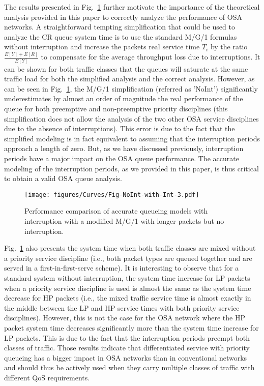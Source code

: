 \documentclass[11pt,journal,oneside,onecolumn,draftclsnofoot]{IEEEtran}
\begin{document}
The results presented in Fig.~\ref{Fig-NoInt-with-Int-3} further motivate the importance of the theoretical analysis provided in this paper to correctly analyze the performance of OSA networks. A straightforward tempting simplification that could be used to analyze the CR queue system time is to use the standard M/G/1 formulas without interruption and increase the packets real service time  $T_i$ by the ratio $\frac{E[Y]+E[R]}{E[Y]}$ to compensate for the average throughput loss due to interruptions. It can be shown for both traffic classes that the queues will saturate at the same traffic load for both the simplified analysis and the correct analysis. However, as can be seen in Fig.~\ref{Fig-NoInt-with-Int-3}, the M/G/1 simplification (referred as 'NoInt') significantly underestimates by almost an order of magnitude the real performance of the queue for both preemptive and non-preemptive priority disciplines (this simplification does not allow the analysis of the two other OSA service disciplines due to the absence of interruptions). This error is due to the fact that the simplified modeling is in fact equivalent to assuming that the interruption periods approach a length of zero. But, as we have discussed previously, interruption periods have a major impact on the OSA queue performance. The accurate modeling of the interruption periods, as we provided in this paper, is thus critical to obtain a valid OSA queue analysis.
\begin{figure}\texttt{[image: figures/Curves/Fig-NoInt-with-Int-3.pdf]}\caption{Performance comparison of accurate queueing models with interruption with a modified M/G/1 with longer packets but no interruption.}\label{Fig-NoInt-with-Int-3}\end{figure}

Fig.~\ref{Fig-NoInt-with-Int-3} also presents the system time when both traffic classes are mixed without a priority service discipline (i.e., both packet types are queued together and are served in a first-in-first-serve scheme). It is interesting to observe that for a standard system without interruption, the system time increase for LP packets when a priority service discipline is used is almost the same as the system time decrease for HP packets (i.e., the mixed traffic service time is almost exactly in the middle between the LP and HP service times with both priority service disciplines). However, this is not the case for the OSA network where the HP packet system time decreases significantly more than the system time increase for LP packets. This is due to the fact that the interruption periods preempt both classes of traffic. Those results indicate that differentiated service with priority queueing has a bigger impact in  OSA networks than in conventional networks and should thus be actively used when they carry multiple classes of traffic with different QoS requirements.
\end{document}
